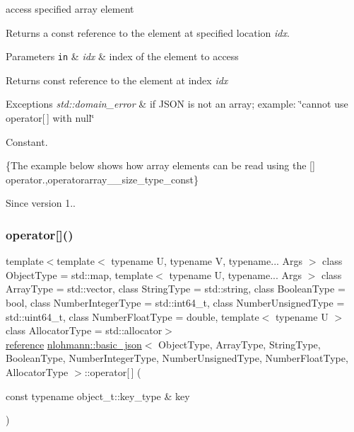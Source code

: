 access specified array element 

Returns a const reference to the element at specified location {\itshape idx}.


\begin{DoxyParams}[1]{Parameters}
\mbox{\tt in}  & {\em idx} & index of the element to access\\
\hline
\end{DoxyParams}
\begin{DoxyReturn}{Returns}
const reference to the element at index {\itshape idx} 
\end{DoxyReturn}

\begin{DoxyExceptions}{Exceptions}
{\em std\+::domain\+\_\+error} & if J\+S\+ON is not an array; example\+: {\ttfamily \char`\"{}cannot use
operator\mbox{[}$\,$\mbox{]} with null\char`\"{}}\\
\hline
\end{DoxyExceptions}
Constant.

\{The example below shows how array elements can be read using the {\ttfamily \mbox{[}\mbox{]}} operator.,operatorarray\+\_\+\+\_\+size\+\_\+type\+\_\+const\}

\begin{DoxySince}{Since}
version 1.. 
\end{DoxySince}
\hypertarget{classnlohmann_1_1basic__json_a92fbb711a36b5ce78ee228b26787c034}{}\label{classnlohmann_1_1basic__json_a92fbb711a36b5ce78ee228b26787c034} 
\subsubsection{\texorpdfstring{operator[]()}{operator[]()}\hspace{0.1cm}{\footnotesize\ttfamily [3/10]}}
{\footnotesize\ttfamily template$<$template$<$ typename U, typename V, typename... Args $>$ class Object\+Type = std\+::map, template$<$ typename U, typename... Args $>$ class Array\+Type = std\+::vector, class String\+Type  = std\+::string, class Boolean\+Type  = bool, class Number\+Integer\+Type  = std\+::int64\+\_\+t, class Number\+Unsigned\+Type  = std\+::uint64\+\_\+t, class Number\+Float\+Type  = double, template$<$ typename U $>$ class Allocator\+Type = std\+::allocator$>$ \\
\hyperlink{classnlohmann_1_1basic__json_a3ec8e17be8732fe436e9d6733f52b7a3}{reference} \hyperlink{classnlohmann_1_1basic__json}{nlohmann\+::basic\+\_\+json}$<$ Object\+Type, Array\+Type, String\+Type, Boolean\+Type, Number\+Integer\+Type, Number\+Unsigned\+Type, Number\+Float\+Type, Allocator\+Type $>$\+::operator\mbox{[}$\,$\mbox{]} (\begin{DoxyParamCaption}\item[{const typename object\+\_\+t\+::key\+\_\+type \&}]{key }\end{DoxyParamCaption})\hspace{0.3cm}{\ttfamily [inline]}}



